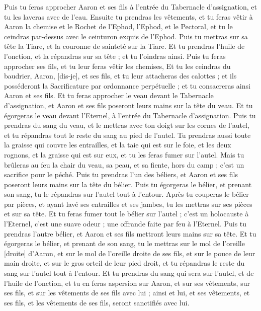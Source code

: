 \begin{multicols}{2}
Puis tu feras approcher Aaron et ses fils à l'entrée du Tabernacle d'assignation, et tu les laveras avec de l'eau.
Ensuite tu prendras les vêtements, et tu feras vêtir à Aaron la chemise et le Rochet de l'Ephod, l'Ephod, et le Pectoral, et tu le ceindras par-dessus avec le ceinturon exquis de l'Ephod.
Puis tu mettras sur sa tête la Tiare, et la couronne de sainteté sur la Tiare.
Et tu prendras l'huile de l'onction, et la répandras sur sa tête ; et tu l'oindras ainsi.
Puis tu feras approcher ses fils, et tu leur feras vêtir les chemises,
Et tu les ceindras du baudrier, Aaron, [dis-je], et ses fils, et tu leur attacheras des calottes ; et ils posséderont la Sacrificature par ordonnance perpétuelle ; et tu consacreras ainsi Aaron et ses fils.
Et tu feras approcher le veau devant le Tabernacle d'assignation, et Aaron et ses fils poseront leurs mains sur la tête du veau.
Et tu égorgeras le veau devant l'Eternel, à l'entrée du Tabernacle d'assignation.
Puis tu prendras du sang du veau, et le mettras avec ton doigt sur les cornes de l'autel, et tu répandras tout le reste du sang au pied de l'autel.
Tu prendras aussi toute la graisse qui couvre les entrailles, et la taie qui est sur le foie, et les deux rognons, et la graisse qui est sur eux, et tu les feras fumer sur l'autel.
Mais tu brûleras au feu la chair du veau, sa peau, et sa fiente, hors du camp ; c'est un sacrifice pour le péché.
Puis tu prendras l'un des béliers, et Aaron et ses fils poseront leurs mains sur la tête du bélier.
Puis tu égorgeras le bélier, et prenant son sang, tu le répandras sur l'autel tout à l’entour.
Après tu couperas le bélier par pièces, et ayant lavé ses entrailles et ses jambes, tu les mettras sur ses pièces et sur sa tête.
Et tu feras fumer tout le bélier sur l'autel ; c'est un holocauste à l'Eternel, c'est une suave odeur ; une offrande faite par feu à l'Eternel.
Puis tu prendras l'autre bélier, et Aaron et ses fils mettront leurs mains sur sa tête.
Et tu égorgeras le bélier, et prenant de son sang, tu le mettras sur le mol de l'oreille [droite] d'Aaron, et sur le mol de l'oreille droite de ses fils, et sur le pouce de leur main droite, et sur le gros orteil de leur pied droit, et tu répandras le reste du sang sur l'autel tout à l’entour.
Et tu prendras du sang qui sera sur l'autel, et de l'huile de l'onction, et tu en feras aspersion sur Aaron, et sur ses vêtements, sur ses fils, et sur les vêtements de ses fils avec lui ; ainsi et lui, et ses vêtements, et ses fils, et les vêtements de ses fils, seront sanctifiés avec lui.

\end{multicols}
